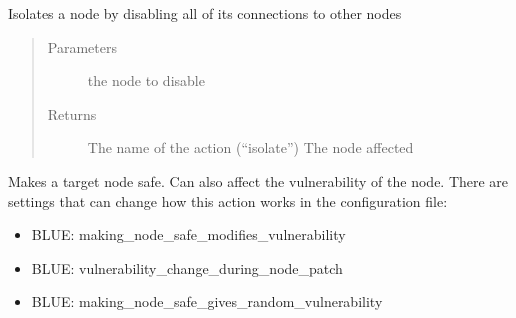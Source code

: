 \documentclass[letterpaper,10pt,english]{sphinxmanual}
\begin{document}
\begin{fulllineitems}
\begin{fulllineitems}
\label{\detokenize{source/yawning_titan.envs.generic.core:yawning_titan.envs.generic.core.blue_action_set.BlueActionSet.isolate_node}}
\sphinxAtStartPar
Isolates a node by disabling all of its connections to other nodes
\begin{quote}\begin{description}
\item[{Parameters}] \leavevmode
\sphinxAtStartPar
{} \textendash{} the node to disable

\item[{Returns}] \leavevmode
\sphinxAtStartPar
The name of the action (“isolate”)
The node affected

\end{description}\end{quote}

\end{fulllineitems}


\begin{fulllineitems}
\label{\detokenize{source/yawning_titan.envs.generic.core:yawning_titan.envs.generic.core.blue_action_set.BlueActionSet.make_safe_node}}
\sphinxAtStartPar
Makes a target node safe. Can also affect the vulnerability of the node. There are settings that can change
how this action works in the configuration file:
\begin{itemize}
\item {}
\sphinxAtStartPar
BLUE: making\_node\_safe\_modifies\_vulnerability

\item {}
\sphinxAtStartPar
BLUE: vulnerability\_change\_during\_node\_patch

\item {}
\sphinxAtStartPar
BLUE: making\_node\_safe\_gives\_random\_vulnerability


\end{itemize}
\end{fulllineitems}
\end{fulllineitems}
\end{document}
